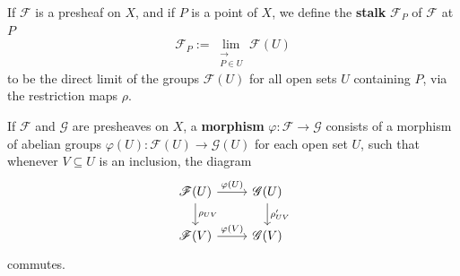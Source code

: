 \documentclass[12pt, oneside]{book}
\begin{document}
\begin{definition}
    If $\mathscr{F}$ is a presheaf on $X$, and if $P$ is a point of $X$, we define the \textbf{stalk} $\mathscr{F}_P$ of $\mathscr{F}$ at $P$
    \begin{equation*}
        \mathscr{F}_P
        :=
        \lim_{\substack{\longrightarrow \\ P \in U}} \mathscr{F}(U)
    \end{equation*}
    to be the direct limit of the groups $\mathscr{F}(U)$ for all open sets $U$ containing $P$, via the restriction maps $\rho$.

\end{definition}

\begin{definition}
    If $\mathscr{F}$ and $\mathscr{G}$ are presheaves on $X$, a \textbf{morphism} $\varphi: \mathscr{F} \rightarrow \mathscr{G}$ consists of a morphism of abelian groups $\varphi(U): \mathscr{F}(U) \rightarrow \mathscr{G}(U)$ for each open set $U$, such that whenever $V \subseteq U$ is an inclusion, the diagram
    \begin{equation*}
        \begin{tikzcd}
            \mathscr{F}(U) \arrow{r}{\varphi(U)} \arrow{d}{\rho_{U V}} & \mathscr{G}(U) \arrow{d}{\rho^\prime_{U V}} \\
            \mathscr{F}(V) \arrow{r}{\varphi(V)}                         & \mathscr{G}(V)
        \end{tikzcd}
    \end{equation*}
    commutes.
\end{definition}
\end{document}
